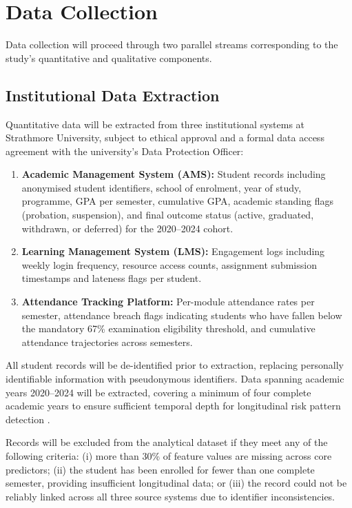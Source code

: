 \documentclass[12pt]{report}
\begin{document}
\section{Data Collection}
\label{sec:data_collection}

Data collection will proceed through two parallel streams corresponding to the study's
quantitative and qualitative components.

\subsection{Institutional Data Extraction}

Quantitative data will be extracted from three institutional systems at Strathmore
University, subject to ethical approval and a formal data access agreement with the
university's Data Protection Officer:

\begin{enumerate}
    \item \textbf{Academic Management System (AMS):} Student records including
    anonymised student identifiers, school of enrolment, year of study,
    programme, GPA per semester, cumulative GPA, academic standing flags
    (probation, suspension), and final outcome status (active, graduated,
    withdrawn, or deferred) for the 2020--2024 cohort.

    \item \textbf{Learning Management System (LMS):} Engagement logs including
    weekly login frequency, resource access counts, assignment submission
    timestamps and lateness flags per student.

    \item \textbf{Attendance Tracking Platform:} Per-module attendance rates per
    semester, attendance breach flags indicating students who have fallen
    below the mandatory 67\% examination eligibility threshold, and cumulative
    attendance trajectories across semesters.
\end{enumerate}

All student records will be de-identified prior to extraction, replacing personally
identifiable information with pseudonymous identifiers. Data spanning academic
years 2020--2024 will be extracted, covering a minimum of four complete academic
years to ensure sufficient temporal depth for longitudinal risk pattern detection
\parencite{bettahi2025, esmael2024}.

Records will be excluded from the analytical dataset if they meet any of the following
criteria: (i) more than 30\% of feature values are missing across core predictors;
(ii) the student has been enrolled for fewer than one complete semester, providing
insufficient longitudinal data; or (iii) the record could not be reliably linked across
all three source systems due to identifier inconsistencies.
\end{document}
